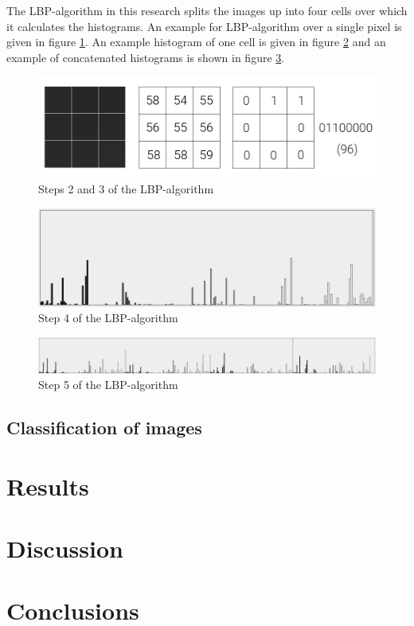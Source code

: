 \documentclass{sig-alternate-br}
\begin{document}
The LBP-algorithm in this research splits the images up into four cells over which it calculates the histograms. An example for LBP-algorithm over a single pixel is given in figure \ref{fig:lbp_pixel}. An example histogram of one cell is given in figure \ref{fig:histogram} and an example of concatenated histograms is shown in figure \ref{fig:concat_histograms}.

\begin{figure}[h]
	\includegraphics[scale=0.2]{lbp_pixel}
	\caption{Steps 2 and 3 of the LBP-algorithm}
	\label{fig:lbp_pixel}
\end{figure}

\begin{figure}[h]
	\includegraphics[scale=0.2]{histogram}
	\caption{Step 4  of the LBP-algorithm}
	\label{fig:histogram}
\end{figure}

\begin{figure}[h]
	\includegraphics[scale=0.1]{concat_histograms}
	\caption{Step 5 of the LBP-algorithm}
	\label{fig:concat_histograms}
\end{figure}

\subsection{Classification of images}


\section{Results} \label{results}


\section{Discussion} \label{discussion}

\section{Conclusions} \label{conclusions}




\balancecolumns
\end{document}
